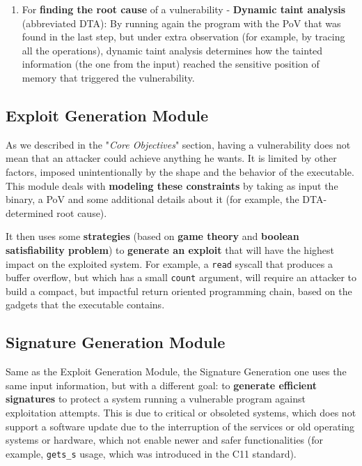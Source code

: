 \documentclass[12pt,a4paper,english,onecolumn]{IEEEtran}
\begin{document}
\begin{enumerate}
    \item  For \textbf{finding the root cause} of a vulnerability
    - \textbf{Dynamic taint analysis} (abbreviated DTA): By running again the program with the PoV that was found in the last step, but under extra observation (for example, by tracing all the operations), dynamic taint analysis determines how the tainted information (the one from the input) reached the sensitive position of memory that triggered the vulnerability.
\end{enumerate}

\subsection{Exploit Generation Module}

As we described in the "\textit{Core Objectives}" section, having a vulnerability does not mean that an attacker could achieve anything he wants. It is limited by other factors, imposed unintentionally by the shape and the behavior of the executable. This module deals with \textbf{modeling these constraints} by taking as input the binary, a PoV and some additional details about it (for example, the DTA-determined root cause).

It then uses some \textbf{strategies} (based on \textbf{game theory} and \textbf{boolean satisfiability problem}) to \textbf{generate an exploit} that will have the highest impact on the exploited system. For example, a \texttt{read} syscall that produces a buffer overflow, but which has a small \texttt{count} argument, will require an attacker to build a compact, but impactful return oriented programming chain, based on the gadgets that the executable contains.

\subsection{Signature Generation Module}

Same as the Exploit Generation Module, the Signature Generation one uses the same input information, but with a different goal: to \textbf{generate efficient signatures} to protect a system running a vulnerable program against exploitation attempts. This is due to critical or obsoleted systems, which does not support a software update due to the interruption of the services or old operating systems or hardware, which not enable newer and safer functionalities (for example, \texttt{gets_s} usage, which was introduced in the C11 standard).
\end{document}
